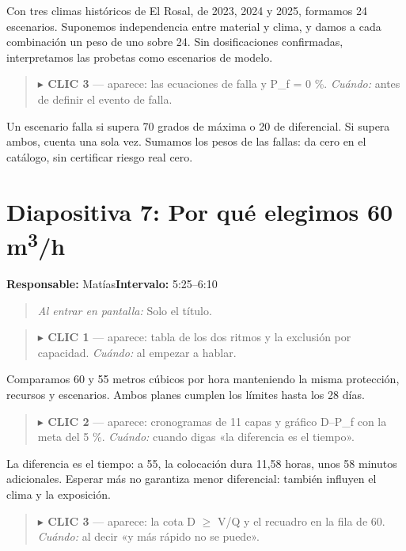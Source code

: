 \documentclass[11pt,a4paper]{article}
\newenvironment{indicacion}{\begin{quote}\small\color{grisindicacion}}{\end{quote}}
\newcommand{\lamina}[4]{%
  \section*{\color{petroleo}Diapositiva #1: #2}%
  \textbf{Responsable:} #3\hfill\textbf{Intervalo:} #4\par
}
\begin{document}
Con tres climas históricos de El Rosal, de 2023, 2024 y 2025, formamos 24 escenarios. Suponemos independencia entre material y clima, y damos a cada combinación un peso de uno sobre 24. Sin dosificaciones confirmadas, interpretamos las probetas como escenarios de modelo.



\begin{indicacion}\textbf{\ensuremath{\blacktriangleright} CLIC 3} --- aparece: las ecuaciones de falla y P\_f = 0 \%. \emph{Cuándo:} antes de definir el evento de falla.\end{indicacion}


Un escenario falla si supera 70 grados de máxima o 20 de diferencial. Si supera ambos, cuenta una sola vez. Sumamos los pesos de las fallas: da cero en el catálogo, sin certificar riesgo real cero.



\clearpage

\lamina{7}{Por qué elegimos 60 m\textsuperscript{3}/h}{Matías}{5:25--6:10}

\begin{indicacion}\emph{Al entrar en pantalla:} Solo el título.\end{indicacion}

\begin{indicacion}\textbf{\ensuremath{\blacktriangleright} CLIC 1} --- aparece: tabla de los dos ritmos y la exclusión por capacidad. \emph{Cuándo:} al empezar a hablar.\end{indicacion}


Comparamos 60 y 55 metros cúbicos por hora manteniendo la misma protección, recursos y escenarios. Ambos planes cumplen los límites hasta los 28 días.



\begin{indicacion}\textbf{\ensuremath{\blacktriangleright} CLIC 2} --- aparece: cronogramas de 11 capas y gráfico D--P\_f con la meta del 5 \%. \emph{Cuándo:} cuando digas «la diferencia es el tiempo».\end{indicacion}


La diferencia es el tiempo: a 55, la colocación dura 11,58 horas, unos 58 minutos adicionales. Esperar más no garantiza menor diferencial: también influyen el clima y la exposición.



\begin{indicacion}\textbf{\ensuremath{\blacktriangleright} CLIC 3} --- aparece: la cota D \ensuremath{\geq} V/Q y el recuadro en la fila de 60. \emph{Cuándo:} al decir «y más rápido no se puede».\end{indicacion}
\end{document}
